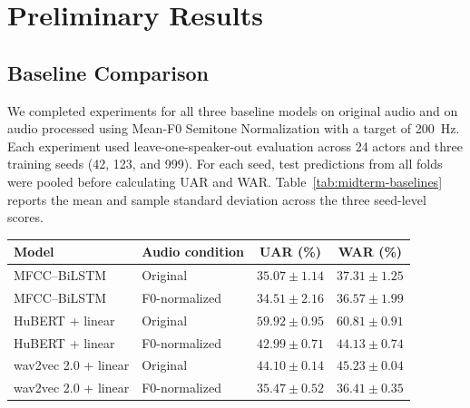 
\section{Preliminary Results}

\subsection{Baseline Comparison}

We completed experiments for all three baseline models on original audio and on audio processed using Mean-F0 Semitone Normalization with a target of 200~Hz. Each experiment used leave-one-speaker-out evaluation across 24 actors and three training seeds (42, 123, and 999). For each seed, test predictions from all folds were pooled before calculating UAR and WAR. Table~\ref{tab:midterm-baselines} reports the mean and sample standard deviation across the three seed-level scores.

\begin{center}
\small
\begin{tabular}{llcc}
\toprule
\textbf{Model} & \textbf{Audio condition} & \textbf{UAR (\%)} & \textbf{WAR (\%)} \\
\midrule
MFCC--BiLSTM & Original & $35.07 \pm 1.14$ & $37.31 \pm 1.25$ \\
MFCC--BiLSTM & F0-normalized & $34.51 \pm 2.16$ & $36.57 \pm 1.99$ \\
HuBERT + linear & Original & $59.92 \pm 0.95$ & $60.81 \pm 0.91$ \\
HuBERT + linear & F0-normalized & $42.99 \pm 0.71$ & $44.13 \pm 0.74$ \\
wav2vec 2.0 + linear & Original & $44.10 \pm 0.14$ & $45.23 \pm 0.04$ \\
wav2vec 2.0 + linear & F0-normalized & $35.47 \pm 0.52$ & $36.41 \pm 0.35$ \\
\bottomrule
\end{tabular}
\label{tab:midterm-baselines}
\end{center}

